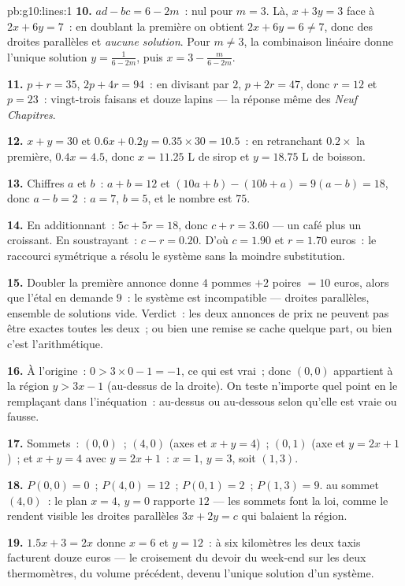 \begin{solution}{pb:g10:lines:1}
\textbf{10.} $ad - bc = 6 - 2m$~: nul pour $m = 3$. Là,
$x + 3y = 3$ face à $2x + 6y = 7$~: en doublant la première on
obtient $2x + 6y = 6 \neq 7$, donc des droites parallèles et
\emph{aucune solution}. Pour $m \neq 3$, la combinaison linéaire
donne l'unique solution $y = \frac{1}{6 - 2m}$, puis
$x = 3 - \frac{m}{6 - 2m}$.

\textbf{11.} $p + r = 35$, $2p + 4r = 94$~: en divisant par $2$,
$p + 2r = 47$, donc $r = 12$ et $p = 23$~: vingt-trois faisans et
douze lapins --- la réponse même des \emph{Neuf Chapitres}.

\textbf{12.} $x + y = 30$ et $0.6x + 0.2y = 0.35 \times 30 = 10.5$~:
en retranchant $0.2 \times$ la première, $0.4x = 4.5$, donc
$x = 11.25$ L de sirop et $y = 18.75$ L de boisson.

\textbf{13.} Chiffres $a$ et $b$~: $a + b = 12$ et
$(10a + b) - (10b + a) = 9(a - b) = 18$, donc $a - b = 2$~:
$a = 7$, $b = 5$, et le nombre est $75$.

\textbf{14.} En additionnant~: $5c + 5r = 18$, donc $c + r = 3.60$
--- un café plus un croissant. En soustrayant~: $c - r = 0.20$.
D'où $c = 1.90$ et $r = 1.70$ euros~: le raccourci symétrique a
résolu le système sans la moindre substitution.

\textbf{15.} Doubler la première annonce donne $4$ pommes $+ 2$
poires $= 10$ euros, alors que l'étal en demande $9$~: le système est
incompatible --- droites parallèles, ensemble de solutions vide.
Verdict~: les deux annonces de prix ne peuvent pas être exactes
toutes les deux~; ou bien une remise se cache quelque part, ou bien
c'est l'arithmétique.

\textbf{16.} À l'origine~: $0 > 3 \times 0 - 1 = -1$, ce qui est
vrai~; donc $(0,0)$ appartient à la région $y > 3x - 1$ (au-dessus de
la droite). On teste n'importe quel point en le remplaçant dans
l'inéquation~: au-dessus ou au-dessous selon qu'elle est vraie ou
fausse.

\textbf{17.} Sommets~: $(0, 0)$~; $(4, 0)$ (axes et $x + y = 4$)~;
$(0, 1)$ (axe et $y = 2x + 1$)~; et $x + y = 4$ avec $y = 2x + 1$~:
$x = 1$, $y = 3$, soit $(1, 3)$.

\textbf{18.} $P(0,0) = 0$~; $P(4, 0) = 12$~; $P(0, 1) = 2$~;
$P(1, 3) = 9$.  au sommet $(4, 0)$~: le plan $x = 4$, $y = 0$
rapporte $12$ --- les sommets font la loi, comme le rendent visible
les droites parallèles $3x + 2y = c$ qui balaient la région.

\textbf{19.} $1.5x + 3 = 2x$ donne $x = 6$ et $y = 12$~: à six
kilomètres les deux taxis facturent douze euros --- le croisement du
devoir du week-end sur les deux thermomètres, du volume précédent,
devenu l'unique solution d'un système.


\end{solution}

